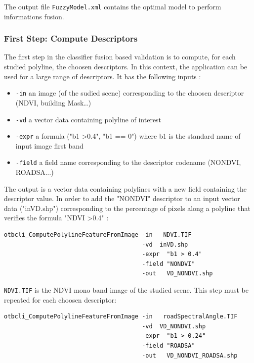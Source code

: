 The output file \verb?FuzzyModel.xml? contains the optimal model to perform
informations fusion.

\subsubsection{First Step: Compute Descriptors}

The first step in the classifier fusion based validation is to compute, for
each studied polyline, the choosen descriptors. In this context, the
 application can be used for a
large range of descriptors. It has the following inputs :
\begin{itemize}
\item \verb?-in? an image (of the sudied scene) corresponding to the choosen
descriptor (NDVI, building Mask\dots)
\item \verb?-vd? a vector data containing polyline of interest
\item \verb?-expr? a formula ("b1 \textgreater 0.4", "b1 == 0") where b1 is
the standard name of input image first band
\item \verb?-field? a field name corresponding to the descriptor codename
(NONDVI, ROADSA...)
\end{itemize}

The output is a vector data containing polylines with a new field containing
the descriptor value. In order to add the "NONDVI" descriptor to an input
vector data ("inVD.shp") corresponding to the percentage of pixels along a
polyline that verifies the formula "NDVI \textgreater 0.4" :

\begin{verbatim}
otbcli_ComputePolylineFeatureFromImage -in   NDVI.TIF
                                       -vd  inVD.shp
                                       -expr  "b1 > 0.4"
                                       -field "NONDVI"
                                       -out   VD_NONDVI.shp
\end{verbatim}

\verb?NDVI.TIF? is the NDVI mono band image of the studied scene.
This step must be repeated for each choosen descriptor:

\begin{verbatim}
otbcli_ComputePolylineFeatureFromImage -in   roadSpectralAngle.TIF
                                       -vd  VD_NONDVI.shp
                                       -expr  "b1 > 0.24"
                                       -field "ROADSA"
                                       -out   VD_NONDVI_ROADSA.shp
\end{verbatim}


